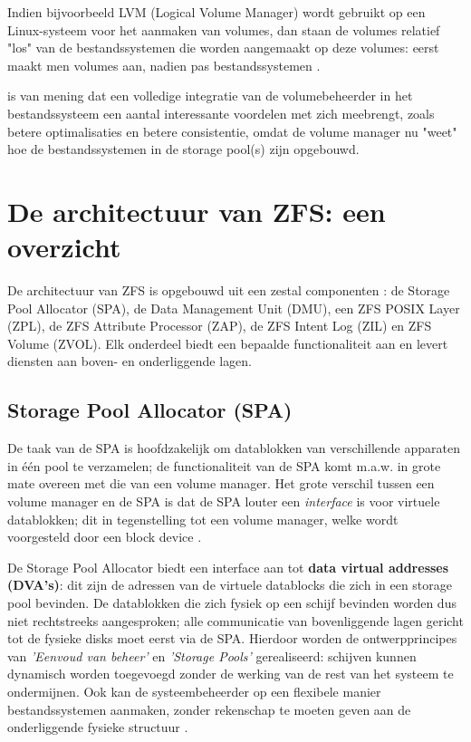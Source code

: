 Indien bijvoorbeeld LVM (Logical Volume Manager) wordt gebruikt op een Linux-systeem voor het aanmaken van volumes, dan staan de volumes relatief "los"  van de bestandssystemen die worden aangemaakt op deze volumes: eerst maakt men volumes aan, nadien pas bestandssystemen \autocite{Lewis2006}. 

\textcite{ZFSBonwick} is van mening dat een volledige integratie van de volumebeheerder in het bestandssysteem een aantal interessante voordelen met zich meebrengt, zoals betere optimalisaties en betere consistentie, omdat de volume manager nu "weet" hoe de bestandssystemen in de storage pool(s) zijn opgebouwd.

\section{De architectuur van ZFS: een overzicht}

De architectuur van ZFS is opgebouwd uit een zestal componenten \autocite{Li2009}: de Storage Pool Allocator (SPA), de Data Management Unit (DMU), een ZFS POSIX Layer (ZPL), de ZFS Attribute Processor (ZAP), de ZFS Intent Log (ZIL) en ZFS Volume (ZVOL). Elk onderdeel biedt een bepaalde functionaliteit aan en levert diensten aan boven- en onderliggende lagen.

\subsection{Storage Pool Allocator (SPA)}

De taak van de SPA is hoofdzakelijk om datablokken van verschillende apparaten in één pool te verzamelen; de functionaliteit van de SPA komt m.a.w. in grote mate overeen met die van een volume manager. Het grote verschil tussen een volume manager en de SPA is dat de SPA louter een \textit{interface} is voor virtuele datablokken; dit in tegenstelling tot een volume manager, welke wordt voorgesteld door een block device \autocite{ZFSBonwick}. 

De Storage Pool Allocator biedt een interface aan tot \textbf{data virtual addresses (DVA's)}: dit zijn de adressen van de virtuele datablocks die zich in een storage pool bevinden. De datablokken die zich fysiek op een schijf bevinden worden dus niet rechtstreeks aangesproken; alle communicatie van bovenliggende lagen gericht tot de fysieke disks moet eerst via de SPA. Hierdoor worden de ontwerpprincipes van \textit{'Eenvoud van beheer'} en \textit{'Storage Pools'} gerealiseerd: schijven kunnen dynamisch worden toegevoegd zonder de werking van de rest van het systeem te ondermijnen. Ook kan de systeembeheerder op een flexibele manier bestandssystemen aanmaken, zonder rekenschap te moeten geven aan de onderliggende fysieke structuur \autocite{ZFSBonwick}.

